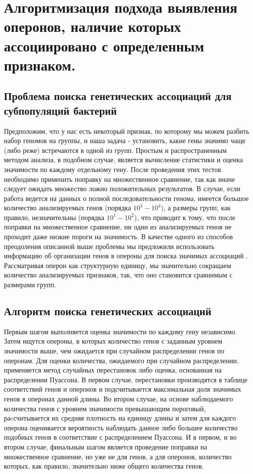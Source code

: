 
\section{Алгоритмизация подхода выявления оперонов, наличие которых ассоциировано с определенным признаком. } \label{chaptOperons}

\subsection{Проблема поиска генетических ассоциаций для субпопуляций бактерий}
Предположим, что у нас есть некоторый признак, по которому мы можем разбить набор геномов на группы, и наша задача - установить, какие гены значимо чаще (либо реже) встречаются в одной из групп. Простым и распространенным методом анализа, в подобном случае, является вычисление статистики и оценка значимости по каждому отдельному гену. После проведения этих тестов необходимо применить поправку на множественное сравнение, так как иначе следует ожидать множество ложно положительных результатов. В случае, если работа ведется на данных о полной последовательности генома, имеется большое количество анализируемых генов (порядка $10^3 - 10^4$), а размеры групп, как правило, незначительны (порядка $10^1 - 10^2$), что приводит к тому, что после поправки на множественное сравнение, ни один из анализируемых генов не проходит даже низкие пороги на значимость. В качестве одного из способов преодоления описанной выше проблемы мы предложили использовать информацию об организации генов в опероны для поиска значимых ассоциаций \cite{rakitina2017genome}. Рассматривая оперон как структурную единицу, мы значительно сокращаем количество анализируемых признаков, так, что оно становится сравнимым с размерами групп.

\subsection{Алгоритм поиска генетических ассоциаций}
Первым шагом выполняется оценка значимости по каждому гену независимо. Затем ищутся опероны, в которых количество генов с заданным уровнем значимости выше, чем ожидается при случайном распределении генов по оперонам. Для оценки количества, ожидаемого при случайном распределении, применяется метод случайных перестановок либо оценка, основанная на распределении Пуассона. В первом случае, перестановки производятся в таблице соответствий генов и оперонов и подсчитывается максимальная доля значимых генов в оперонах данной длины. Во втором случае, на основе наблюдаемого количества генов с уровнем значимости превышающим пороговый, раcсчитывается их средняя плотность на единицу длины и затем для каждого оперона оценивается вероятность наблюдать данное либо большее количество подобных генов в соответствие с распределением Пуассона. И в первом, и во втором случае, финальным шагом является проведение поправки на множественное сравнение, но уже не для генов, а для оперонов, количество которых, как правило, значительно ниже общего количества генов.

